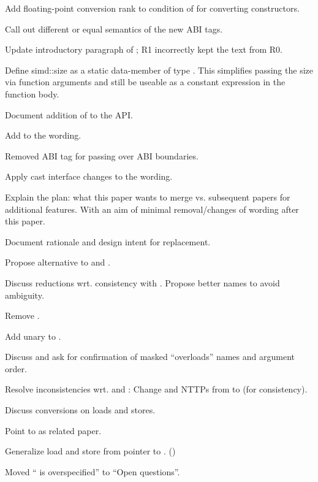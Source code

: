 \begin{revision}
\item Add floating-point conversion rank to condition of  for converting constructors.
\item Call out different or equal semantics of the new ABI tags.
\item Update introductory paragraph of ; R1 incorrectly kept the text from R0.
\item Define simd::size as a  static data-member of type . This simplifies passing the size via function arguments and still be useable as a constant expression in the function body.
\item Document addition of  to the API.
\item Add  to the wording.
\item Removed ABI tag for passing  over ABI boundaries.
\item Apply cast interface changes to the wording.
\item Explain the plan: what this paper wants to merge vs. subsequent papers for additional features. With an aim of minimal removal/changes of wording after this paper.
\item Document rationale and design intent for  replacement.
\end{revision}

\begin{revision}
\item Propose alternative to  and .
\item Discuss  reductions wrt. consistency with . Propose better names to avoid ambiguity.
\item Remove .
\item Add unary \code{\~{}} to .
\item Discuss and ask for confirmation of masked ``overloads'' names and argument order.
\item Resolve inconsistencies wrt.  and : Change  and  NTTPs from  to  (for consistency).
\item Discuss conversions on loads and stores.
\item Point to \cite{P2509R0} as related paper.
\item Generalize load and store from pointer to . ()
\item Moved `` is overspecified'' to ``Open questions''.
\end{revision}

